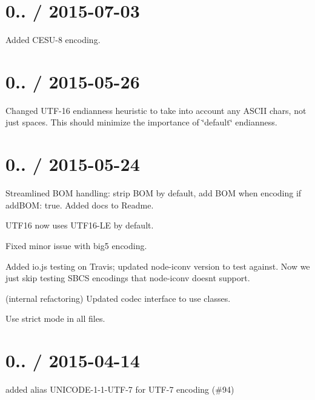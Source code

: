 \section*{0.. / 2015-\/07-\/03}


\begin{DoxyItemize}
\item Added C\+E\+S\+U-\/8 encoding.
\end{DoxyItemize}

\section*{0.. / 2015-\/05-\/26}


\begin{DoxyItemize}
\item Changed U\+T\+F-\/16 endianness heuristic to take into account any A\+S\+C\+II chars, not just spaces. This should minimize the importance of \char`\"{}default\char`\"{} endianness.
\end{DoxyItemize}

\section*{0.. / 2015-\/05-\/24}


\begin{DoxyItemize}
\item Streamlined B\+OM handling\+: strip B\+OM by default, add B\+OM when encoding if add\+B\+OM\+: true. Added docs to Readme.
\item U\+T\+F16 now uses U\+T\+F16-\/\+LE by default.
\item Fixed minor issue with big5 encoding.
\item Added io.\+js testing on Travis; updated node-\/iconv version to test against. Now we just skip testing S\+B\+CS encodings that node-\/iconv doesn\textquotesingle{}t support.
\item (internal refactoring) Updated codec interface to use classes.
\item Use strict mode in all files.
\end{DoxyItemize}

\section*{0.. / 2015-\/04-\/14}


\begin{DoxyItemize}
\item added alias U\+N\+I\+C\+O\+D\+E-\/1-\/1-\/\+U\+T\+F-\/7 for U\+T\+F-\/7 encoding (\#94)
\end{DoxyItemize}

